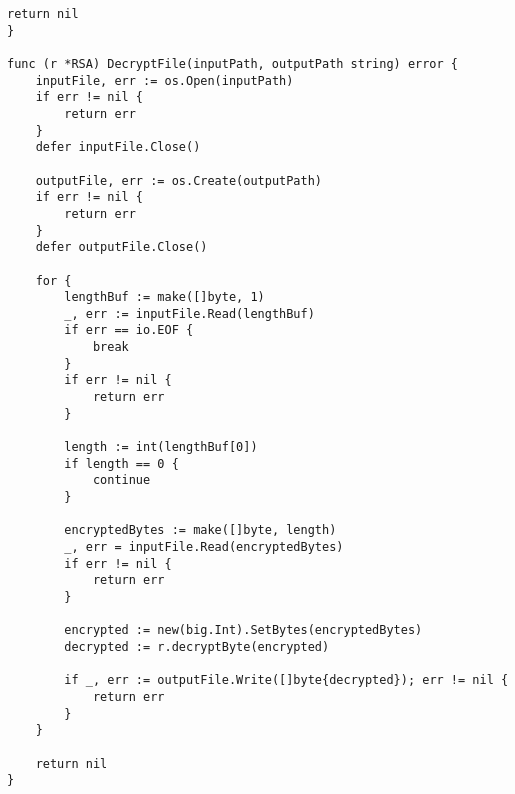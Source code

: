 \begin{lstlisting}[style=golang, caption={Реализация алгоритма шифрования и расшифровки с открытым ключом файла}, label=lst:codegolang]
	return nil
}

func (r *RSA) DecryptFile(inputPath, outputPath string) error {
	inputFile, err := os.Open(inputPath)
	if err != nil {
		return err
	}
	defer inputFile.Close()
	
	outputFile, err := os.Create(outputPath)
	if err != nil {
		return err
	}
	defer outputFile.Close()
	
	for {
		lengthBuf := make([]byte, 1)
		_, err := inputFile.Read(lengthBuf)
		if err == io.EOF {
			break
		}
		if err != nil {
			return err
		}
		
		length := int(lengthBuf[0])
		if length == 0 {
			continue
		}
		
		encryptedBytes := make([]byte, length)
		_, err = inputFile.Read(encryptedBytes)
		if err != nil {
			return err
		}
		
		encrypted := new(big.Int).SetBytes(encryptedBytes)
		decrypted := r.decryptByte(encrypted)
		
		if _, err := outputFile.Write([]byte{decrypted}); err != nil {
			return err
		}
	}
	
	return nil
}

\end{lstlisting}



